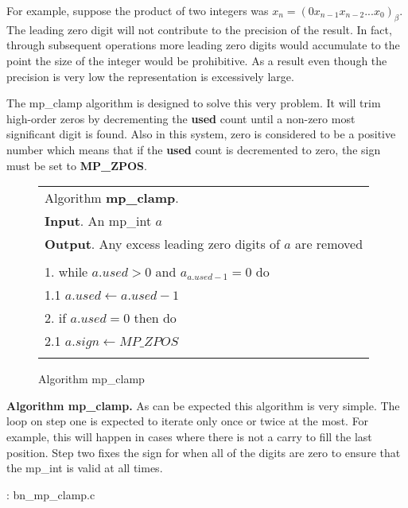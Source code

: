 \documentclass[b5paper]{book}
\begin{document}
For example, suppose the product of two integers was $x_n = (0x_{n-1}x_{n-2}...x_0)_{\beta}$.  The leading zero digit 
will not contribute to the precision of the result.  In fact, through subsequent operations more leading zero digits would
accumulate to the point the size of the integer would be prohibitive.  As a result even though the precision is very 
low the representation is excessively large.  

The mp\_clamp algorithm is designed to solve this very problem.  It will trim high-order zeros by decrementing the 
\textbf{used} count until a non-zero most significant digit is found.  Also in this system, zero is considered to be a 
positive number which means that if the \textbf{used} count is decremented to zero, the sign must be set to 
\textbf{MP\_ZPOS}.

\begin{figure}[here]
\begin{center}
\begin{tabular}{l}
\hline Algorithm \textbf{mp\_clamp}. \\
\textbf{Input}.   An mp\_int $a$ \\
\textbf{Output}.  Any excess leading zero digits of $a$ are removed \\
\hline \\
1.  while $a.used > 0$ and $a_{a.used - 1} = 0$ do \\
\hspace{+3mm}1.1  $a.used \leftarrow a.used - 1$ \\
2.  if $a.used = 0$ then do \\
\hspace{+3mm}2.1  $a.sign \leftarrow MP\_ZPOS$ \\
\hline \\
\end{tabular}
\end{center}
\caption{Algorithm mp\_clamp}
\end{figure}

\textbf{Algorithm mp\_clamp.}
As can be expected this algorithm is very simple.  The loop on step one is expected to iterate only once or twice at
the most.  For example, this will happen in cases where there is not a carry to fill the last position.  Step two fixes the sign for 
when all of the digits are zero to ensure that the mp\_int is valid at all times.

\vspace{+3mm}\begin{small}
\hspace{-5.1mm}{\bf File}: bn\_mp\_clamp.c
\vspace{-3mm}
\begin{alltt}
\end{alltt}
\end{small}
\end{document}
